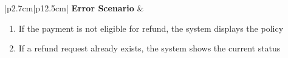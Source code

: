 \begin{table}[H]
\begin{tabular}{|p{2.7cm}|p{12.5cm}|}
            \hline
            \textbf{Error Scenario} & \begin{minipage}[t]{\linewidth}
                                          \begin{enumerate}[topsep=0pt,itemsep=1pt,parsep=0pt,partopsep=0pt]
                                              \item If the payment is not eligible for refund, the system displays the policy
                                              \item If a refund request already exists, the system shows the current status
                                          \end{enumerate}
                                      \end{minipage} \\
            \hline
        \end{tabular}
        \label{tab:eng-refund}
    \end{table}

